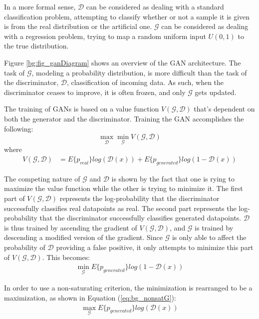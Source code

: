 	\par In a more formal sense, $\mathcal{D}$ can be considered as dealing with a standard classification problem, attempting to classify whether or not a sample it is given is from the real distribution or the artificial one. $\mathcal{G}$ can be considered as dealing with a regression problem, trying to map a random uniform input $U(0,1)$ to the true distribution. 
	\par Figure \ref{bg:fig_ganDiagram} shows an overview of the GAN architecture. The task of $\mathcal{G}$, modeling a probability distribution, is more difficult than the task of the discriminator, $\mathcal{D}$, classification of incoming data. As such, when the discriminator ceases to improve, it is often frozen, and only $\mathcal{G}$ gets updated. 
	\par The training of GANs is based on a value function $V(\mathcal{G},\mathcal{D})$ that's dependent on both the generator and the discriminator. Training the GAN accomplishes the following: 
	\[ \max_\mathcal{D}\min_\mathcal{G} V(\mathcal{G},\mathcal{D}) \] where
	\begin{align}
		V(\mathcal{G},\mathcal{D}) &= E\{p_{real}\}log(\mathcal{D}(x)) + E\{p_{generated}\} log(1-\mathcal{D}(x))
	\end{align}
	\par The competing nature of $\mathcal{G}$ and $\mathcal{D}$ is shown by the fact that one is rying to maximize the value function while the other is trying to minimize it. The first part of $V(\mathcal{G},\mathcal{D})$ represents the log-probability that the discriminator successfully classifies real datapoints as real. The second part represents the log-probability that the discriminator successfully classifies generated datapoints. $\mathcal{D}$ is thus trained by ascending the gradient of $V(\mathcal{G},\mathcal{D})$, and $\mathcal{G}$ is trained by descending a modified version of the gradient. Since $\mathcal{G}$ is only able to affect the probability of $\mathcal{D}$ providing a false positive, it only attempts to minimize this part of $V(\mathcal{G},\mathcal{D})$. This becomes:
	\begin{align}
		\min_\mathcal{G} E\{p_{generated}\} log(1-\mathcal{D}(x))
	\end{align}
	\par In order to use a non-saturating criterion, the minimization is rearranged to be a maximization, as shown in Equation (\ref{eq:bg_nonsatG}):
	\begin{align}
		\max_\mathcal{G} E\{p_{generated}\} log(\mathcal{D}(x)) \label{eq:bg_nonsatG} 
	\end{align}
	
